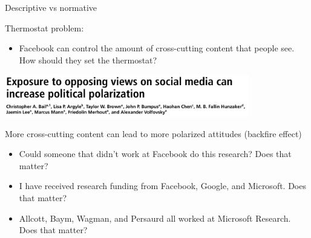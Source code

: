 \documentclass[aspectratio=169]{beamer}
\begin{document}
\begin{frame}

\begin{center}
\Large{Descriptive vs normative}
\end{center}


\end{frame}
\begin{frame}

Thermostat problem:
\begin{itemize}
\item Facebook can control the amount of cross-cutting content that people see.  How should they set the thermostat?
\end{itemize}

\end{frame}
\begin{frame}

\begin{center}
\includegraphics[width=0.80\textwidth]{figures/bail_exposure_2018_title}
\end{center}

\vfill
More cross-cutting content can lead to more polarized attitudes (backfire effect)

\end{frame}
\begin{frame}

\begin{itemize}
\item Could someone that didn't work at Facebook do this research? Does that matter? \pause
\item I have received research funding from Facebook, Google, and Microsoft.  Does that matter?  \pause
\item Allcott, Baym, Wagman, and Persaurd all worked at Microsoft Research. Does that matter?
\end{itemize}

\end{frame}
\end{document}
